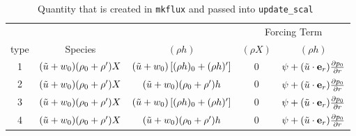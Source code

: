 \begin{table*}
\begin{center}
\caption{Quantity that is created in {\tt mkflux} and passed into {\tt update\_scal}\newline\
}
\begin{tabular}{c|c|c|c|c}
       &            &              &\multicolumn{2}{c}{Forcing Term} \\
{type} & {Species } & {$(\rho h)$} & {$(\rho X)$} & {$(\rho h)$} \\
\hline 
1 & $(\tilde{u}+w_0)(\rho_0+\rho^\prime) X          $ & $(\tilde{u}+w_0)\left [(\rho h)_0 + (\rho h)^\prime\right]$ & 0 & $ \psi + (\tilde{u} \cdot \mathbf{e}_r) \frac{\partial p_0}{\partial r} $ \\[2mm]
2 & $(\tilde{u}+w_0)(\rho_0+\rho^\prime) X          $ & $(\tilde{u}+w_0) (\rho_0+\rho^\prime) h$ & 0 & $ \psi + (\tilde{u} \cdot \mathbf{e}_r) \frac{\partial p_0}{\partial r} $ \\[2mm]
3 & $(\tilde{u}+w_0)(\rho_0+\rho^\prime) X          $ & $(\tilde{u}+w_0)\left [(\rho h)_0 + (\rho h)^\prime\right]$ & 0 & $ \psi + (\tilde{u} \cdot \mathbf{e}_r) \frac{\partial p_0}{\partial r}$ \\[2mm]
4 & $(\tilde{u}+w_0)(\rho_0+\rho^\prime) X          $ & $(\tilde{u}+w_0) (\rho_0+\rho^\prime) h$ & 0 & $ \psi + (\tilde{u} \cdot \mathbf{e}_r) \frac{\partial p_0}{\partial r} $ \\[2mm]
\hline
\end{tabular}
\end{center}
\end{table*}

